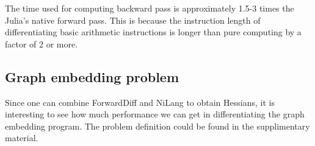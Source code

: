 \documentclass{article}
\newcommand{\<}{\langle}
\renewcommand{\>}{\rangle}
\newcommand{\ra}[1]{\renewcommand{\arraystretch}{#1}}
\theoremstyle{definition}\newtheorem{definition}{\textit{Definition}}
\begin{document}
\begin{table}[h!]\centering
\begin{minipage}{0.8\columnwidth}
\ra{1.3}
    \caption{Absolute runtimes in seconds for computing the objectives (O) and the backward pass (B) of sparse matrix operations. The matrix size is $1000 \times 1000$, and the element density is $0.05$. The total time used in computing gradient can be estimated as a sum of ``O'' and ``B''.
    }\label{tbl:sparse}
\end{minipage}
\end{table}

The time used for computing backward pass is approximately 1.5-3 times the Julia's native forward pass.
This is because the instruction length of differentiating basic arithmetic instructions is longer than pure computing by a factor of 2 or more.


\subsection{Graph embedding problem}\label{sec:graphbench}
Since one can combine ForwardDiff and NiLang to obtain Hessians,
it is interesting to see how much performance we can get in differentiating the graph embedding program. The problem definition could be found in the supplimentary material.
\end{document}
